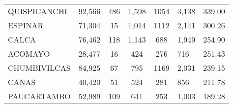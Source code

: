 \begin{tabular}{lrccclr}
	\cellcolor[HTML]{FFE699}QUISPICANCHI                           & 92,566                                                         & 486                                                         & 1,598                & 1054                     & 3,138                                                               & 339.00                                                                       \\
	\cellcolor[HTML]{FFE699}ESPINAR                                & 71,304                                                         & 15                                                          & 1,014                & 1112                     & 2,141                                                               & 300.26                                                                       \\
	\cellcolor[HTML]{FFE699}CALCA                                  & 76,462                                                         & 118                                                         & 1,143                & 688                      & 1,949                                                               & 254.90                                                                       \\
	\cellcolor[HTML]{FFE699}ACOMAYO                                & 28,477                                                         & 16                                                          & 424                  & 276                      & 716                                                                 & 251.43                                                                       \\
	\cellcolor[HTML]{FFE699}CHUMBIVILCAS                           & 84,925                                                         & 67                                                          & 795                  & 1169                     & 2,031                                                               & 239.15                                                                       \\
	\cellcolor[HTML]{C6E0B4}CANAS                                  & 40,420                                                         & 51                                                          & 524                  & 281                      & 856                                                                 & 211.78                                                                       \\
	\cellcolor[HTML]{C6E0B4}PAUCARTAMBO                            & 52,989                                                         & 109                                                         & 641                  & 253                      & 1,003                                                               & 189.28                                                                       \\

\end{tabular}
